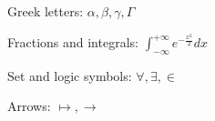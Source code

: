 \documentclass[a4paper]{article}
\begin{document}


Greek letters: $\alpha,  \beta, \gamma, \Gamma$

Fractions and integrals: $\int_{-\infty}^{+\infty} e^{ -\frac{x^2}{2}} dx$

Set and logic symbols: $\forall, \exists, \in$

Arrows: $\mapsto, \rightarrow$
\end{document}
